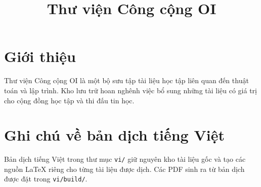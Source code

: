 \documentclass[11pt]{article}
\title{Thư viện Công cộng OI}
\author{}
\date{}
\begin{document}
\maketitle

\section*{Giới thiệu}

Thư viện Công cộng OI là một bộ sưu tập tài liệu học tập liên quan đến thuật
toán và lập trình. Kho lưu trữ hoan nghênh việc bổ sung những tài liệu có giá
trị cho cộng đồng học tập và thi đấu tin học.

\section*{Ghi chú về bản dịch tiếng Việt}

Bản dịch tiếng Việt trong thư mục \texttt{vi/} giữ nguyên kho tài liệu gốc và
tạo các nguồn LaTeX riêng cho từng tài liệu được dịch. Các PDF sinh ra từ bản
dịch được đặt trong \texttt{vi/build/}.
\end{document}
